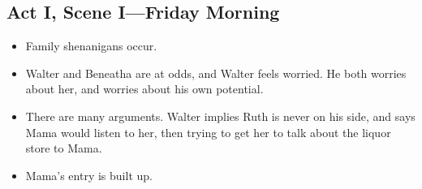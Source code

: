 \documentclass[11pt]{article}
\begin{document}
\subsection{Act I, Scene I---Friday Morning}
\begin{itemize}
	\item Family shenanigans occur.
	\item Walter and Beneatha are at odds, and Walter feels worried.  He both 
		worries about her, and worries about his own potential.
	\item There are many arguments.  Walter implies Ruth is never on his side, and
		says Mama would listen to her, then trying to get her to talk about the
		liquor store to Mama.
	\item Mama's entry is built up.  
\end{itemize}
\end{document}
